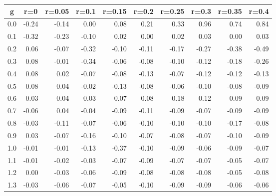 %
\begin{table}[!tbp]
 \begin{center}
 \begin{tabular}{rrrrrrrrrr}\hline\hline
\multicolumn{1}{c}{g}&\multicolumn{1}{c}{r=0}&\multicolumn{1}{c}{r=0.05}&\multicolumn{1}{c}{r=0.1}&\multicolumn{1}{c}{r=0.15}&\multicolumn{1}{c}{r=0.2}&\multicolumn{1}{c}{r=0.25}&\multicolumn{1}{c}{r=0.3}&\multicolumn{1}{c}{r=0.35}&\multicolumn{1}{c}{r=0.4}\tabularnewline
\hline
0.0&-0.24&-0.14& 0.00& 0.08& 0.21& 0.33& 0.96& 0.74& 0.84\tabularnewline
0.1&-0.32&-0.23&-0.10& 0.02& 0.00& 0.02& 0.03& 0.00& 0.03\tabularnewline
0.2& 0.06&-0.07&-0.32&-0.10&-0.11&-0.17&-0.27&-0.38&-0.49\tabularnewline
0.3& 0.08&-0.01&-0.34&-0.06&-0.08&-0.10&-0.12&-0.18&-0.26\tabularnewline
0.4& 0.08& 0.02&-0.07&-0.08&-0.13&-0.07&-0.12&-0.12&-0.13\tabularnewline
0.5& 0.08& 0.04&-0.02&-0.13&-0.08&-0.06&-0.10&-0.08&-0.09\tabularnewline
0.6& 0.03& 0.04&-0.03&-0.07&-0.08&-0.18&-0.12&-0.09&-0.09\tabularnewline
0.7&-0.06& 0.04&-0.04&-0.09&-0.11&-0.09&-0.07&-0.09&-0.09\tabularnewline
0.8&-0.03&-0.11&-0.07&-0.06&-0.10&-0.10&-0.10&-0.17&-0.08\tabularnewline
0.9& 0.03&-0.07&-0.16&-0.10&-0.07&-0.08&-0.07&-0.10&-0.09\tabularnewline
1.0&-0.01&-0.01&-0.13&-0.37&-0.10&-0.09&-0.06&-0.09&-0.07\tabularnewline
1.1&-0.01&-0.02&-0.03&-0.07&-0.09&-0.07&-0.07&-0.05&-0.07\tabularnewline
1.2& 0.00&-0.03&-0.06&-0.09&-0.08&-0.08&-0.08&-0.05&-0.08\tabularnewline
1.3&-0.03&-0.06&-0.07&-0.05&-0.10&-0.09&-0.09&-0.06&-0.06\tabularnewline
\hline
\end{tabular}

\end{center}

\end{table}

